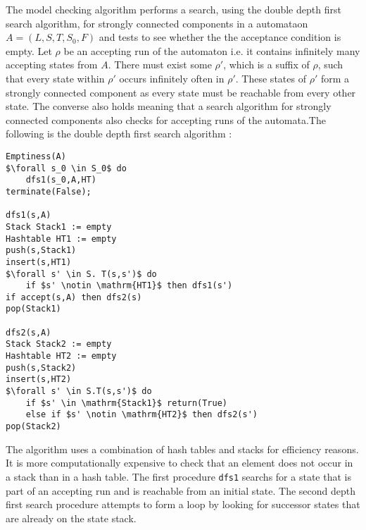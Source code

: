 The model checking algorithm performs a search, using the double depth first search algorithm, for strongly connected components in a \Buchi automataon $A = (L,S,T, S_0, F)$ and tests to see whether the the acceptance condition is empty. Let $\rho$ be an accepting run of the automaton i.e. it contains infinitely many accepting states from $A$.  There must exist some $\rho'$, which is a suffix of $\rho$, such that every state within $\rho'$ occurs infinitely often in $\rho'$. These states of $\rho'$ form a strongly connected component as every state must be reachable from every other state. The converse also holds meaning that a search algorithm for strongly connected components also checks for accepting runs of the automata.The following is the double depth first search algorithm \cite{CC91,GH96}:

\begin{lstlisting}[caption = The Double Depth First Search Algorithm, mathescape]
Emptiness(A)
$\forall s_0 \in S_0$ do
	dfs1(s_0,A,HT)
terminate(False);

dfs1(s,A)
Stack Stack1 := empty
Hashtable HT1 := empty
push(s,Stack1)
insert(s,HT1)
$\forall s' \in S. T(s,s')$ do
	if $s' \notin \mathrm{HT1}$ then dfs1(s')
if accept(s,A) then dfs2(s)
pop(Stack1)

dfs2(s,A)
Stack Stack2 := empty
Hashtable HT2 := empty
push(s,Stack2)
insert(s,HT2)
$\forall s' \in S.T(s,s')$ do
	if $s' \in \mathrm{Stack1}$ return(True)
	else if $s' \notin \mathrm{HT2}$ then dfs2(s')
pop(Stack2)
\end{lstlisting}

The algorithm uses a combination of hash tables and stacks for efficiency reasons. It is more computationally expensive to check that an element does not occur in a stack than in a hash table. The first procedure \texttt{dfs1} searchs for a state that is part of an accepting run and  is reachable from an initial state. The second depth first search procedure attempts to form a loop by looking for successor states that are already on the state stack. 



